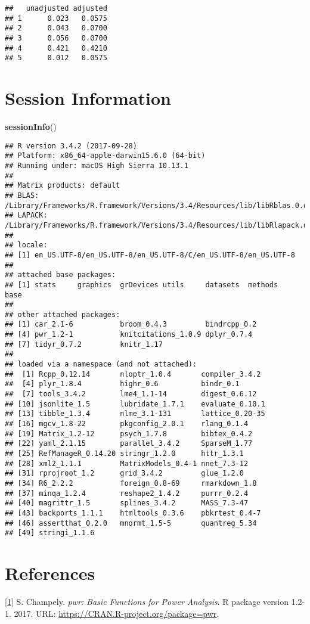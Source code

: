 \documentclass[]{article}
\newenvironment{Shaded}{\begin{snugshade}}{\end{snugshade}}
\newcommand{\KeywordTok}[1]{\textcolor[rgb]{0.13,0.29,0.53}{\textbf{{#1}}}}
\newcommand{\NormalTok}[1]{{#1}}
\begin{document}
\begin{verbatim}
##   unadjusted adjusted
## 1      0.023   0.0575
## 2      0.043   0.0700
## 3      0.056   0.0700
## 4      0.421   0.4210
## 5      0.012   0.0575
\end{verbatim}

\section{Session Information}\label{session-information}

\begin{Shaded}
\begin{Highlighting}[]
\KeywordTok{sessionInfo}\NormalTok{()}
\end{Highlighting}
\end{Shaded}

\begin{verbatim}
## R version 3.4.2 (2017-09-28)
## Platform: x86_64-apple-darwin15.6.0 (64-bit)
## Running under: macOS High Sierra 10.13.1
## 
## Matrix products: default
## BLAS: /Library/Frameworks/R.framework/Versions/3.4/Resources/lib/libRblas.0.dylib
## LAPACK: /Library/Frameworks/R.framework/Versions/3.4/Resources/lib/libRlapack.dylib
## 
## locale:
## [1] en_US.UTF-8/en_US.UTF-8/en_US.UTF-8/C/en_US.UTF-8/en_US.UTF-8
## 
## attached base packages:
## [1] stats     graphics  grDevices utils     datasets  methods   base     
## 
## other attached packages:
## [1] car_2.1-6           broom_0.4.3         bindrcpp_0.2       
## [4] pwr_1.2-1           knitcitations_1.0.9 dplyr_0.7.4        
## [7] tidyr_0.7.2         knitr_1.17         
## 
## loaded via a namespace (and not attached):
##  [1] Rcpp_0.12.14       nloptr_1.0.4       compiler_3.4.2    
##  [4] plyr_1.8.4         highr_0.6          bindr_0.1         
##  [7] tools_3.4.2        lme4_1.1-14        digest_0.6.12     
## [10] jsonlite_1.5       lubridate_1.7.1    evaluate_0.10.1   
## [13] tibble_1.3.4       nlme_3.1-131       lattice_0.20-35   
## [16] mgcv_1.8-22        pkgconfig_2.0.1    rlang_0.1.4       
## [19] Matrix_1.2-12      psych_1.7.8        bibtex_0.4.2      
## [22] yaml_2.1.15        parallel_3.4.2     SparseM_1.77      
## [25] RefManageR_0.14.20 stringr_1.2.0      httr_1.3.1        
## [28] xml2_1.1.1         MatrixModels_0.4-1 nnet_7.3-12       
## [31] rprojroot_1.2      grid_3.4.2         glue_1.2.0        
## [34] R6_2.2.2           foreign_0.8-69     rmarkdown_1.8     
## [37] minqa_1.2.4        reshape2_1.4.2     purrr_0.2.4       
## [40] magrittr_1.5       splines_3.4.2      MASS_7.3-47       
## [43] backports_1.1.1    htmltools_0.3.6    pbkrtest_0.4-7    
## [46] assertthat_0.2.0   mnormt_1.5-5       quantreg_5.34     
## [49] stringi_1.1.6
\end{verbatim}

\section{References}\label{references}

\protect\hyperlink{cite-pwr}{{[}1{]}} S. Champely. \emph{pwr: Basic
Functions for Power Analysis}. R package version 1.2-1. 2017. URL:
\url{https://CRAN.R-project.org/package=pwr}.
\end{document}
